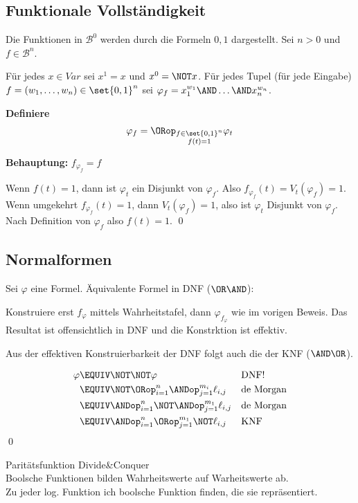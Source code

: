 \subsection{Funktionale Vollständigkeit}

Die Funktionen in $\mathcal{B}^0$ werden durch die Formeln $0,1$ dargestellt.
Sei $n>0$ und $f\in\mathcal{B}^n$.

Für jedes $x\in Var$ sei $x^1=x$ und $x^0=\NOT x$. Für jedes Tupel (für jede Eingabe)
$f=(w_1,\dots,w_n)\in\set{0,1}^n$ sei $\varphi_f=x_1^{w_1}\AND\dots\AND x_n^{w_n}$.

\textbf{Definiere}
\begin{align}
  \varphi_f = \ORop_{\substack{f\in\set{0,1}^n\\ f(t) = 1}} \varphi_t
\end{align}

\textbf{Behauptung:} $f_{\varphi_f} = f$

Wenn $f(t) = 1$, dann ist $\varphi_t$ ein Disjunkt von $\varphi_f$. Also
$f_{\varphi_f}(t) = V_t(\varphi_f)=1$. Wenn umgekehrt $f_{\varphi_f}(t) = 1$,
dann $V_t(\varphi_f)=1$, also ist $\varphi_t$ Disjunkt von $\varphi_f$. Nach
Definition von $\varphi_f$ also $f(t)=1$. \qed


\subsection{Normalformen}

Sei $\varphi$ eine Formel. Äquivalente Formel in DNF ($\OR\AND$):

Konstruiere erst $f_\varphi$ mittels Wahrheitstafel, dann $\varphi_{f_\varphi}$
wie im vorigen Beweis. Das Resultat ist offensichtlich in DNF und die
Konstrktion ist effektiv.

Aus der effektiven Konstruierbarkeit der DNF folgt auch die der KNF ($\AND\OR$).

\begin{align}
  \varphi &\EQUIV \NOT\NOT \varphi                                 &&\text{DNF!}\\
          &\EQUIV \NOT\ORop_{i=1}^n \ANDop_{j=1}^{m_i} \ell_{i,j}  &&\text{de Morgan}\\
          &\EQUIV \ANDop_{i=1}^n \NOT\ANDop_{j=1}^{m_1} \ell_{i,j} &&\text{de Morgan}\\
          &\EQUIV \ANDop_{i=1}^n \ORop_{j=1}^{m_1} \NOT\ell_{i,j}  &&\text{KNF}
\end{align}
\qed


Paritätsfunktion Divide\&Conquer\\
Boolsche Funktionen bilden Wahrheitswerte auf Warheitswerte ab.\\
Zu jeder log. Funktion ich boolsche Funktion finden, die sie repräsentiert.\\

